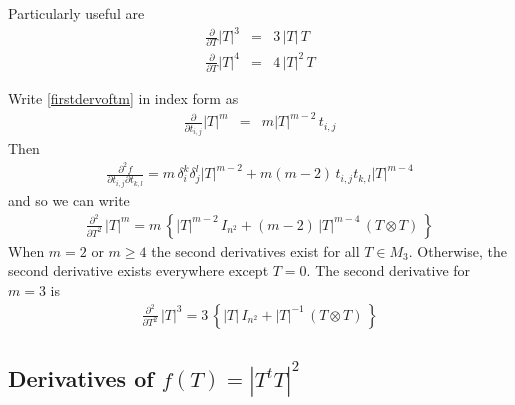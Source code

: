 \documentclass{report}
\begin{document}
\noindent Particularly useful are
\begin{eqnarray}
\label{tcubed}
\frac{\partial}{\partial T} |T|^3 & = & 3 \, |T| \, T \\
\frac{\partial}{\partial T} |T|^4 & = & 4 \, |T|^2 \, T 
\end{eqnarray}

 \newline

\noindent Write \ref{firstdervoftm} in index form as
\begin{eqnarray}
\frac{\partial}{\partial t_{i,j}} |T|^m & = & m |T|^{m-2} \, t_{i,j}
\end{eqnarray}
Then
\begin{eqnarray}
\frac{\partial^2 f}{\partial t_{i,j} \partial t_{k,l}} = m \, \delta_i^k \delta_j^l |T|^{m-2} + m (m-2) \, t_{i,j} t_{k,l} |T|^{m-4}
\end{eqnarray}
and so we can write
\begin{eqnarray}
\frac{\partial^2}{\partial T^2} \, |T|^m = m \, \left\{ |T|^{m-2} \, I_{n^2} + (m-2) \, |T|^{m-4} \, \left( T \otimes T \right) \, \right\} \label{hesstm}
\end{eqnarray}
When $m=2$ or $m \geq 4$ the second derivatives exist for all $T \in M_3$.
Otherwise, the second derivative exists everywhere except $T=0$. 
The second derivative for $m=3$ is
\begin{eqnarray}
\label{hesst3}
\frac{\partial^2}{\partial T^2} \, |T|^3 = 3 \, \left\{ |T| \, I_{n^2} + |T|^{-1} \, \left( T \otimes T \right) \, \right\}
\end{eqnarray}

\subsection{Derivatives of $f(T)=|T^t T|^2$}
\end{document}

